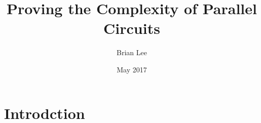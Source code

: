 \documentclass{article}
\title{Proving the Complexity of Parallel Circuits}
\author{Brian Lee}
\date{May 2017}
\begin{document}
\maketitle

\section{Introdction}
\end{document}
